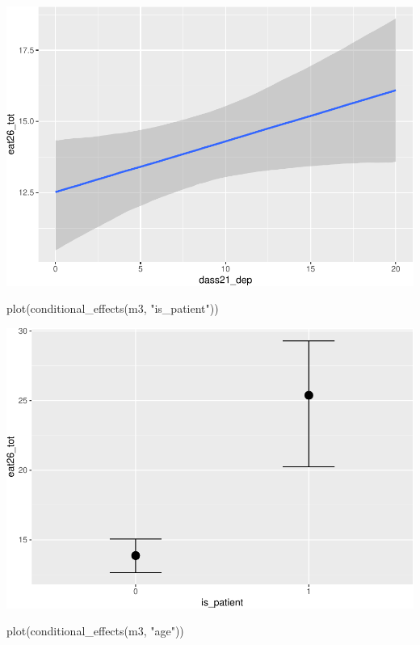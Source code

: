 \documentclass[
]{article}
\newenvironment{Shaded}{\begin{snugshade}}{\end{snugshade}}
\newcommand{\FunctionTok}[1]{\textcolor[rgb]{0.00,0.00,0.00}{#1}}
\newcommand{\NormalTok}[1]{#1}
\newcommand{\StringTok}[1]{\textcolor[rgb]{0.31,0.60,0.02}{#1}}
\begin{document}
\includegraphics{050_quest_groups_files/figure-latex/unnamed-chunk-2-4.pdf}

\begin{Shaded}
\begin{Highlighting}[]
\FunctionTok{plot}\NormalTok{(}\FunctionTok{conditional\_effects}\NormalTok{(m3, }\StringTok{"is\_patient"}\NormalTok{))}
\end{Highlighting}
\end{Shaded}

\includegraphics{050_quest_groups_files/figure-latex/unnamed-chunk-2-5.pdf}

\begin{Shaded}
\begin{Highlighting}[]
\FunctionTok{plot}\NormalTok{(}\FunctionTok{conditional\_effects}\NormalTok{(m3, }\StringTok{"age"}\NormalTok{))}
\end{Highlighting}
\end{Shaded}
\end{document}
